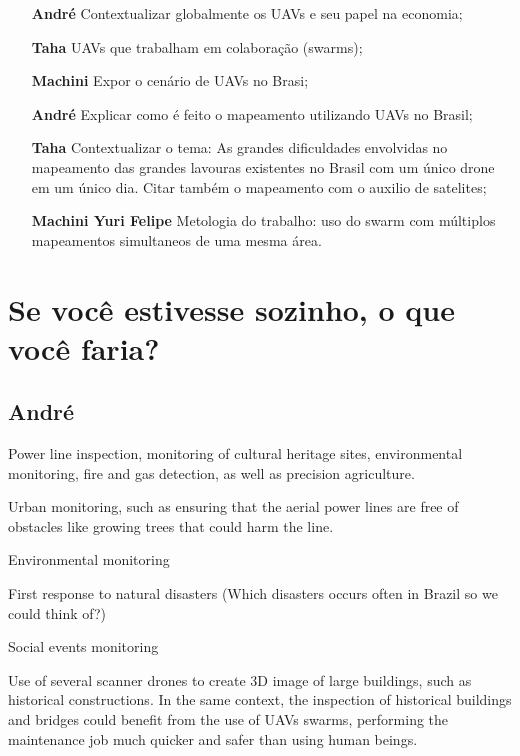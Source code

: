 \documentclass{article}
\begin{document}
\begin{itemize}
    
    \item[\textbf{André}] Contextualizar globalmente os UAVs e seu papel na economia;
    
    \item[\textbf{Taha}] UAVs que trabalham em colaboração (swarms);
    
    \item[\textbf{Machini}] Expor o cenário de UAVs no Brasi;
    
    \item[\textbf{André}] Explicar como é feito o mapeamento utilizando UAVs no Brasil;
    
    \item[\textbf{Taha}] Contextualizar o tema: As grandes dificuldades envolvidas no mapeamento das grandes lavouras existentes no Brasil com um único drone em um único dia. Citar também o mapeamento com o auxilio de satelites;
    
    \item[\textbf{Machini Yuri Felipe }] Metologia do trabalho: uso do swarm com múltiplos mapeamentos simultaneos de uma mesma área.
    
\end{itemize}

\section{Se você estivesse sozinho, o que você faria?}

\subsection{André}

    Power line inspection, monitoring of cultural heritage sites, environmental monitoring, fire and gas detection, as well as precision agriculture.
    
    Urban monitoring, such as ensuring that the aerial power lines are free of obstacles like growing trees that could harm the line.
    
    Environmental monitoring
    
    First response to natural disasters (Which disasters occurs often in Brazil so we could think of?)
    
    Social events monitoring
    
    Use of several scanner drones to create 3D image of large buildings, such as historical constructions. In the same context, the inspection of historical buildings and bridges could benefit from the use of UAVs swarms, performing the maintenance job much quicker and safer than using human beings.
    
\end{document}
